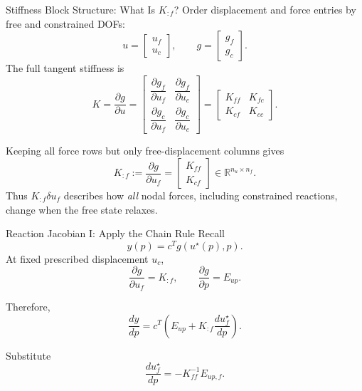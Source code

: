 \documentclass[aspectratio=169,10pt]{beamer}
\newcommand{\Kff}{K_{\!ff}}
\newcommand{\Eup}{E_{up}}
\newcommand{\Eupf}{E_{up,f}}
\begin{document}
\begin{frame}{Stiffness Block Structure: What Is $K_{:f}$?}
  \small
  Order displacement and force entries by free and constrained DOFs:
  \[
    u=
    \begin{bmatrix}u_f\\u_c\end{bmatrix},
    \qquad
    g=
    \begin{bmatrix}g_f\\g_c\end{bmatrix}.
  \]
  The full tangent stiffness is
  \[
    K=\frac{\partial g}{\partial u}
    =
    \begin{bmatrix}
      \dfrac{\partial g_f}{\partial u_f} &
      \dfrac{\partial g_f}{\partial u_c}\\[0.7em]
      \dfrac{\partial g_c}{\partial u_f} &
      \dfrac{\partial g_c}{\partial u_c}
    \end{bmatrix}
    =
    \begin{bmatrix}
      K_{ff}&K_{fc}\\
      K_{cf}&K_{cc}
    \end{bmatrix}.
  \]

  Keeping all force rows but only free-displacement columns gives
  \[
    \boxed{
      K_{:f}
      :=
      \frac{\partial g}{\partial u_f}
      =
      \begin{bmatrix}K_{ff}\\K_{cf}\end{bmatrix}
      \in\mathbb R^{n_u\times n_f}
    }.
  \]
  Thus $K_{:f}\delta u_f$ describes how \emph{all} nodal forces, including
  constrained reactions, change when the free state relaxes.
\end{frame}

\begin{frame}{Reaction Jacobian I: Apply the Chain Rule}
  \small
  Recall
  \[
    y(p)=c^Tg(u^\star(p),p).
  \]
  At fixed prescribed displacement $u_c$,
  \[
    \frac{\partial g}{\partial u_f}=K_{:f},
    \qquad
    \frac{\partial g}{\partial p}=\Eup.
  \]

  Therefore,
  \[
    \frac{dy}{dp}
    =
    c^T
    \left(
      \Eup+
      K_{:f}\frac{du_f^\star}{dp}
    \right).
  \]

  Substitute
  \[
    \frac{du_f^\star}{dp}=-\Kff^{-1}\Eupf.
  \]
\end{frame}
\end{document}
